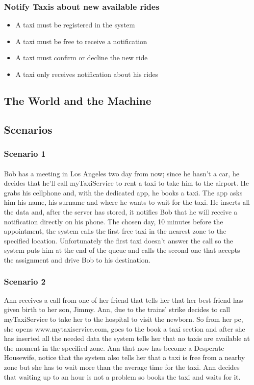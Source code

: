		\subsubsection{Notify Taxis about new available rides}
		\begin{itemize}
			\item A taxi must be registered in the system
			\item A taxi must be free to receive a notification
			\item A taxi must confirm or decline the new ride
			\item A taxi only receives notification about his rides
		\end{itemize}
	\subsection{The World and the Machine}
	\subsection{Scenarios}
		\subsubsection{Scenario 1}
		\paragraph*{}Bob has a meeting in Los Angeles two day from now; since he hasn't a car, he decides that he'll call myTaxiService to rent a taxi to take him to the airport. He grabs his cellphone and, with the dedicated app, he books a taxi. The app asks him his name, his surname and where he wants to wait for the taxi. He inserts all the data and, after the server has stored, it notifies Bob that he will receive a notification directly on his phone. The chosen day, 10 minutes before the appointment, the system calls the first free taxi in the nearest zone to the specified location. Unfortunately the first taxi doesn't answer the call so the system puts him at the end of the queue and calls the second one that accepts the assignment and drive Bob to his destination.
		
		\subsubsection{Scenario 2}
		Ann receives a call from one of her friend that tells her that her best friend has given birth to her son, Jimmy. Ann, due to the trains' strike decides to call myTaxiService to take her to the hospital to visit the newborn. So from her pc, she opens www.mytaxiservice.com, goes to the book a taxi section and after she has inserted all the needed data the system tells her that no taxis are available at the moment in the specified zone. Ann that now has become a Desperate Housewife, notice that the system also tells her that a taxi is free from a nearby zone but she has to wait more than the average time for the taxi. Ann decides that waiting up to an hour is not a problem so books the taxi and waits for it. 
		
